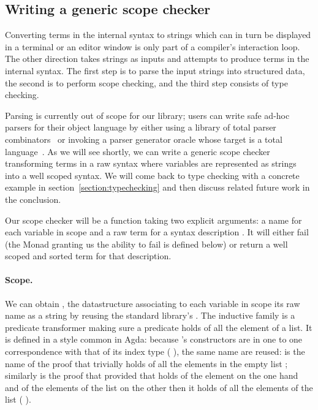 \subsection{Writing a generic scope checker}\label{section:genericscoping}

Converting terms in the internal syntax to strings which can in turn be
displayed in a terminal or an editor window is only part of a compiler's
interaction loop. The other direction takes strings as inputs and attempts to
produce terms in the internal syntax. The first step is to parse the input
strings into structured data, the second is to perform scope checking,
and the third step consists of type checking.

Parsing is currently out of scope for our library; users can write safe
ad-hoc parsers for their object language by either using a library of total
parser combinators~\cite{DBLP:conf/icfp/Danielsson10,allais2018agdarsec}
or invoking a parser generator oracle whose target is a total
language~\cite{Stump:2016:VFP:2841316}. As we will see shortly, we can
write a generic scope checker transforming terms in a raw syntax where
variables are represented as strings into a well scoped syntax. We will
come back to type checking with a concrete example in section~\ref{section:typechecking}
and then discuss related future work in the conclusion.

Our scope checker will be a function taking two explicit arguments: a
name for each variable in scope  and a raw term for a syntax
description .  It will either fail (the Monad  granting
us the ability to fail is defined below) or return a well scoped and
sorted term for that description.

\begin{agdasnippet}
\end{agdasnippet}


\paragraph{Scope.} We can obtain , the datastructure associating to
each variable in scope its raw name as a string by reusing the standard library's
. The inductive family  is a predicate transformer making sure a
predicate holds of all the element of a list. It is defined in a style common in
Agda: because 's constructors are in one to one correspondence with that
of its index type ( ), the same name are reused: \AIC{[]} is the
name of the proof that  trivially holds of all the elements in the empty
list \AIC{[]}; similarly  is the proof that provided that  holds
of the element  on the one hand and of the elements of the list 
on the other then it holds of all the elements of the list (  ).

